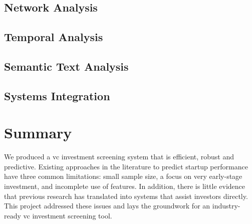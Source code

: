 \documentclass[../thesis/thesis.tex]{subfiles}
\begin{document}
\subsection{Network Analysis} %
\subsection{Temporal Analysis} %
\subsection{Semantic Text Analysis} %
\subsection{Systems Integration} %

\section{Summary}

We produced a \gls{vc} investment screening system that is efficient, robust and predictive. Existing approaches in the literature to predict startup performance have three common limitations: small sample size, a focus on very early-stage investment, and incomplete use of features. In addition, there is little evidence that previous research has translated into systems that assist investors directly. This project addressed these issues and lays the groundwork for an industry-ready \gls{vc} investment screening tool.

\end{document}
